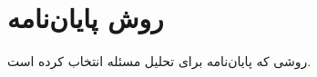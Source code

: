 \documentclass{article}[a4paper, 11px]
\begin{document}
\section{
روش پایان‌نامه
}
روشی که پایان‌نامه برای تحلیل مسئله انتخاب کرده است.

\end{document}
